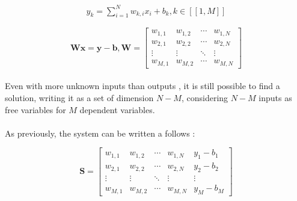 \documentclass{article}
\begin{document}
\begin{align}
    y_{k} = \sum_{i=1}^{N} w_{k,i}x_{i} + b_{k} ,  k \in [\![1,M]\!]
\end{align}

\begin{equation}
    \textbf{W}\textbf{x}=\textbf{y}-\textbf{b},\textbf{W}= 
    \begin{bmatrix}
    w_{1,1} & w_{1,2} & \cdots & w_{1,N} \\
    w_{2,1} & w_{2,2} & \cdots & w_{2,N} \\
    \vdots  & \vdots  & \ddots & \vdots  \\
    w_{M,1} & w_{M,2} & \cdots & w_{M,N} 
    \end{bmatrix}
    \end{equation}
\\
    Even with more unknown inputs than outputs , 
    it is still possible to find a solution, writing it as a set of dimension $N-M$, considering $N-M$ inputs as free variables for $M$ dependent variables.
    \\
    \\
    As previously, the system can be written a follows : 

    \begin{equation*}
        \textbf{S}= \left[\begin{array}{cccc|c}  
        w_{1,1} & w_{1,2} & \cdots & w_{1,N} & y_{1}-b_{1} \\
        w_{2,1} & w_{2,2} & \cdots & w_{2,N} & y_{2}-b_{2}\\
        \vdots  & \vdots  & \ddots & \vdots & \vdots\\
        w_{M,1} & w_{M,2} & \cdots & w_{M,N} & y_{M}-b_{M}
       \end{array}\right]
    \end{equation*}
\end{document}
